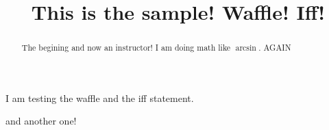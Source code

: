 \documentclass{ximera}
\title[Breal-grond]{This is the sample! Waffle!  Iff!}
\begin{document}
\begin{abstract}
  The begining and now an instructor! I am doing math like $\arcsin$. AGAIN
\end{abstract}

\maketitle

\mypreamble

I am testing the waffle and the iff statement.



and another one!


\begin{theorem}
  \label{thm:whee}
\end{theorem}
\end{document}
